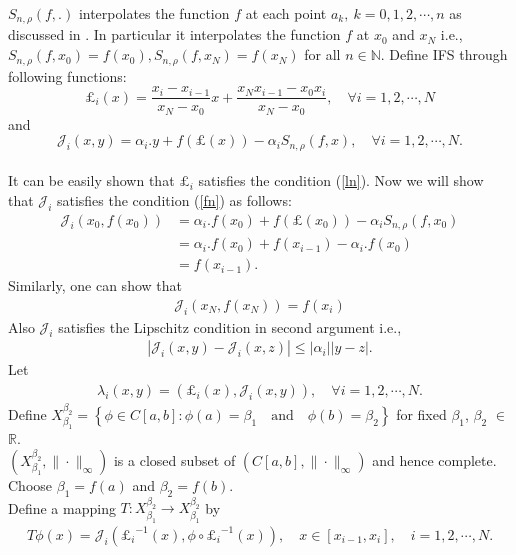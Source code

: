 \documentclass{article}[12pt, a4]
\begin{document}
	
	$S_{n,\rho}(f, .)$ interpolates the function $f$ at each point $a_k,~k=0,1,2,\cdots, n$ as discussed in \cite{QIAN2022126781}. In particular it interpolates the function $f$ at $x_0$ and $x_N$ i.e.,  $S_{n,\rho}\left(f, x_{0}\right)=f\left(x_{0}\right), S_{n,\rho}\left(f, x_{N}\right)=f\left(x_{N}\right)$ for all $n \in \mathbb{N}$.
	Define IFS through following functions:
	\begin{equation}\label{defli}
		\pounds_i(x)= \frac{x_i -x_{i-1}}{x_N-x_0}x +\frac{x_N x_{i-1} -x_0 x_i}{x_N-x_0}, \quad \forall i=1,2,\cdots,N
	\end{equation}
	and 
	\begin{equation}\label{deffi}
		\mathcal{J}_i(x,y)=\alpha_{i}.y+f(\pounds(x))-\alpha_{i}S_{n,\rho}(f, x), \quad \forall i=1,2,\cdots,N.
	\end{equation}\\
	It can be easily shown that $\pounds_i$ satisfies the condition (\ref{ln}). Now we will show that $\mathcal{J}_i$ satisfies the condition (\ref{fn}) as follows:
	\begin{align*}
		\mathcal{J}_i(x_0,f(x_0))&=\alpha_{i}.f(x_0)+f(\pounds(x_0))-\alpha_{i}S_{n,\rho}(f, x_0)\\
		&=\alpha_{i}.f(x_0)+f(x_{i-1})-\alpha_{i}.f(x_0)\\
		&=f(x_{i-1}).
	\end{align*}
	Similarly, one can show that
	\begin{align*}
		\mathcal{J}_i(x_N,f(x_N))=f(x_i)
	\end{align*}
	Also $\mathcal{J}_i$ satisfies the Lipschitz condition in second argument i.e.,
	\begin{align*}
		|\mathcal{J}_i(x,y)-\mathcal{J}_i(x,z)|\leq |\alpha_{i}||y-z|.
	\end{align*}
	Let \begin{align*}
		\lambda_{i}(x,y)=(\pounds_i(x), \mathcal{J}_i(x,y)),\quad \forall i=1,2,\cdots,N.
	\end{align*}
	Define $X_{\beta_1}^{\beta_2}=\left\{\phi\in C[a,b]: \phi(a)=\beta_1 \quad \text{and} \quad \phi(b)=\beta_2\right \}$ for fixed $\beta_1$, $\beta_2$ $\in$ $\mathbb{R}$.\\
	$(X_{\beta_1}^{\beta_2},\|\cdot\|_\infty)$ is a closed subset of $(C[a,b],\|\cdot\|_\infty)$ and hence complete. Choose $\beta_1=f(a)$ and $\beta_2=f(b)$. \\
	Define a mapping $T:X_{\beta_1}^{\beta_2}\rightarrow X_{\beta_1}^{\beta_2}$ by
	\begin{align}\label{cont}
		T\phi(x)=\mathcal{J}_i({\pounds_i}^{-1}(x),\phi\circ {\pounds_i}^{-1}(x)), \quad x \in [x_{i-1}, x_{i}], \quad i =1,2,\cdots,N.
	\end{align}
\end{document}
